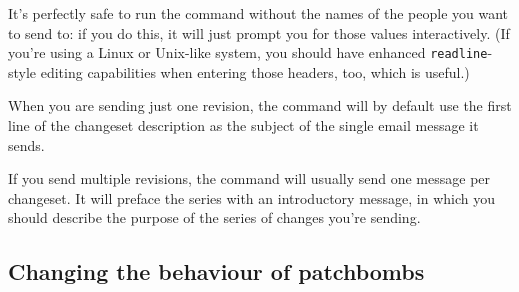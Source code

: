 It's perfectly safe to run the  command
without the names of the people you want to send to: if you do this,
it will just prompt you for those values interactively.  (If you're
using a Linux or Unix-like system, you should have enhanced
\texttt{readline}-style editing capabilities when entering those
headers, too, which is useful.)

When you are sending just one revision, the 
command will by default use the first line of the changeset
description as the subject of the single email message it sends.

If you send multiple revisions, the  command
will usually send one message per changeset.  It will preface the
series with an introductory message, in which you should describe the
purpose of the series of changes you're sending.

\subsection{Changing the behaviour of patchbombs}

